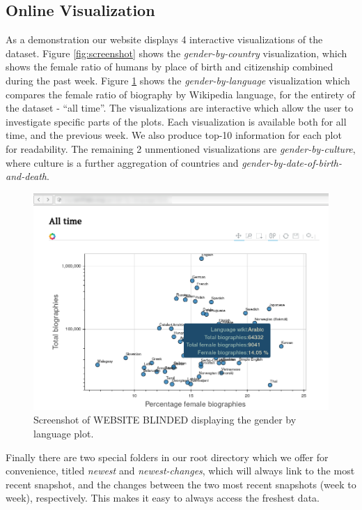 \documentclass[letterpaper]{article}
\begin{document}
\subsection{Online Visualization}
As a demonstration our website displays 4 interactive visualizations of the dataset. Figure \ref{fig:screenshot} shows the \textit{gender-by-country} visualization, which shows the female ratio of humans by place of birth and citizenship combined during the past week. Figure \ref{fig:screenshot2} shows the \textit{gender-by-language} visualization which compares the female ratio of biography by Wikipedia language, for the entirety of the dataset - ``all time''. The visualizations are interactive which allow the user to investigate specific parts of the plots. Each visualization is available both for all time, and the previous week. We also produce top-10 information for each plot for readability. The remaining 2 unmentioned visualizations are \textit{gender-by-culture}, where culture is a further aggregation of countries and \textit{gender-by-date-of-birth-and-death}.

\begin{figure}
\label{fig:screenshot2}
\includegraphics[scale=0.25]{figures/screenshot2.png} 
\caption{Screenshot of WEBSITE BLINDED displaying the gender by language plot.}
\end{figure}

Finally there are two special folders in our root directory which we offer for convenience,  titled \textit{newest} and \textit{newest-changes}, which will always link to the most recent snapshot, and the changes between the two most recent snapshots (week to week), respectively. This makes it easy to always access the freshest data.
\end{document}
